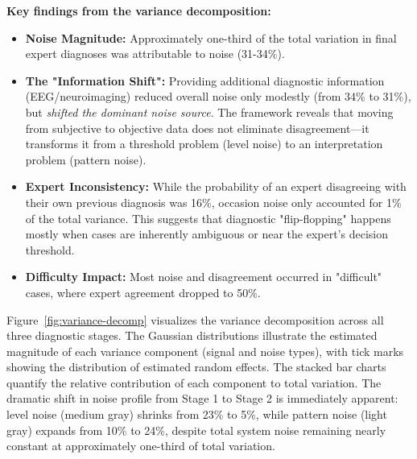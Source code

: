 \textbf{Key findings from the variance decomposition:}

\begin{itemize}
    \item \textbf{Noise Magnitude:} Approximately one-third of the total variation in final expert diagnoses was attributable to noise (31-34\%).

    \item \textbf{The "Information Shift":} Providing additional diagnostic information (EEG/neuroimaging) reduced overall noise only modestly (from 34\% to 31\%), but \textit{shifted the dominant noise source}. The framework reveals that moving from subjective to objective data does not eliminate disagreement---it transforms it from a threshold problem (level noise) to an interpretation problem (pattern noise).

    \item \textbf{Expert Inconsistency:} While the probability of an expert disagreeing with their own previous diagnosis was 16\%, occasion noise only accounted for 1\% of the total variance. This suggests that diagnostic "flip-flopping" happens mostly when cases are inherently ambiguous or near the expert's decision threshold. 

    \item \textbf{Difficulty Impact:} Most noise and disagreement occurred in "difficult" cases, where expert agreement dropped to 50\%.
\end{itemize}

Figure~\ref{fig:variance-decomp} visualizes the variance decomposition across all three diagnostic stages. The Gaussian distributions illustrate the estimated magnitude of each variance component (signal and noise types), with tick marks showing the distribution of estimated random effects. The stacked bar charts quantify the relative contribution of each component to total variation. The dramatic shift in noise profile from Stage 1 to Stage 2 is immediately apparent: level noise (medium gray) shrinks from 23\% to 5\%, while pattern noise (light gray) expands from 10\% to 24\%, despite total system noise remaining nearly constant at approximately one-third of total variation.

